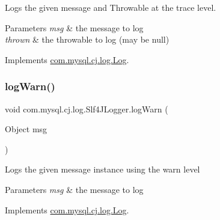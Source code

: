Logs the given message and Throwable at the \textquotesingle{}trace\textquotesingle{} level.


\begin{DoxyParams}{Parameters}
{\em msg} & the message to log \\
\hline
{\em thrown} & the throwable to log (may be null) \\
\hline
\end{DoxyParams}


Implements \mbox{\hyperlink{interfacecom_1_1mysql_1_1cj_1_1log_1_1_log_aa93fa5550a3152afd64479adca676200}{com.\+mysql.\+cj.\+log.\+Log}}.

\mbox{\label{classcom_1_1mysql_1_1cj_1_1log_1_1_slf4_j_logger_a9b6bd04f7179ae6e572fb9ac91ade49e}} 
\subsubsection{\texorpdfstring{log\+Warn()}{logWarn()}\hspace{0.1cm}{\footnotesize\ttfamily [1/2]}}
{\footnotesize\ttfamily void com.\+mysql.\+cj.\+log.\+Slf4\+J\+Logger.\+log\+Warn (\begin{DoxyParamCaption}\item[{Object}]{msg }\end{DoxyParamCaption})}

Logs the given message instance using the \textquotesingle{}warn\textquotesingle{} level


\begin{DoxyParams}{Parameters}
{\em msg} & the message to log \\
\hline
\end{DoxyParams}


Implements \mbox{\hyperlink{interfacecom_1_1mysql_1_1cj_1_1log_1_1_log_a3a30dcfb7f5790b79e9db64431107cfc}{com.\+mysql.\+cj.\+log.\+Log}}.

\mbox{\label{classcom_1_1mysql_1_1cj_1_1log_1_1_slf4_j_logger_a617f07e2c9b52bc774d8e8ea83ace092}} 
